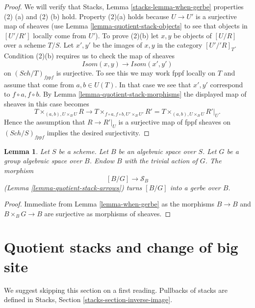 \documentclass{stacks-project}
\theoremstyle{plain}
\newtheorem{lemma}[subsection]{Lemma}
\theoremstyle{definition}
\theoremstyle{remark}
\numberwithin{equation}{subsection}
\def\Sch{\mathit{Sch}}
\begin{document}
\begin{proof}
We will verify that
Stacks, Lemma \ref{stacks-lemma-when-gerbe}
properties (2) (a) and (2) (b) hold. Property (2)(a) holds because $U \to U'$
is a surjective map of sheaves (use
Lemma \ref{lemma-quotient-stack-objects}
to see that objects in $[U'/R']$ locally come from $U'$).
To prove (2)(b) let $x, y$ be objects of $[U/R]$ over a scheme $T/S$.
Let $x', y'$ be the images of $x, y$ in the category $[U'/'R]_T$.
Condition (2)(b) requires us to check the map of sheaves
$$
\mathit{Isom}(x, y) \longrightarrow \mathit{Isom}(x', y')
$$
on $(\Sch/T)_{fppf}$ is surjective. To see this we may work
fppf locally on $T$ and assume that come from $a, b \in U(T)$.
In that case we see that $x', y'$ correspond to $f \circ a, f \circ b$. By
Lemma \ref{lemma-quotient-stack-morphisms}
the displayed map of sheaves in this case becomes
$$
T \times_{(a, b), U \times_B U} R
\longrightarrow
T \times_{f \circ a, f \circ b, U' \times_B U'} R' =
T \times_{(a, b), U \times_B U} R'|_U.
$$
Hence the assumption that $R \to R'|_U$ is a surjective map of fppf sheaves
on $(\Sch/S)_{fppf}$ implies the desired surjectivity.
\end{proof}

\begin{lemma}
\label{lemma-group-quotient-gerbe}
Let $S$ be a scheme. Let $B$ be an algebraic space over $S$. Let
$G$ be a group algebraic space over $B$. Endow $B$ with the trivial
action of $G$. The morphism
$$
[B/G] \longrightarrow \mathcal{S}_B
$$
(Lemma \ref{lemma-quotient-stack-arrows})
turns $[B/G]$ into a gerbe over $B$.
\end{lemma}

\begin{proof}
Immediate from
Lemma \ref{lemma-when-gerbe}
as the morphisms $B \to B$ and $B \times_B G \to B$ are surjective
as morphisms of sheaves.
\end{proof}








\section{Quotient stacks and change of big site}
\label{section-bigger-site}

\noindent
We suggest skipping this section on a first reading.
Pullbacks of stacks are defined in
Stacks, Section \ref{stacks-section-inverse-image}.
\end{document}
